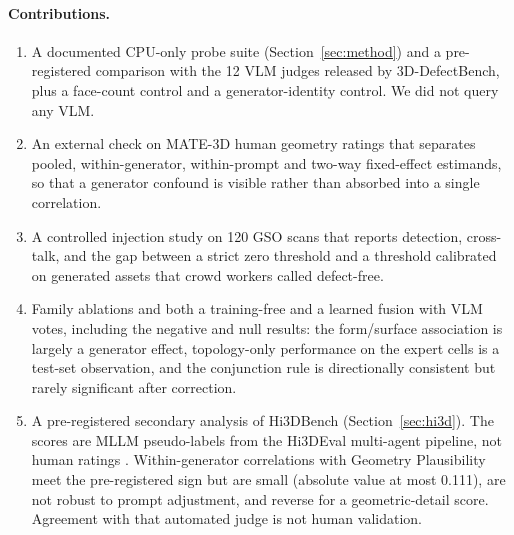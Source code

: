 \paragraph{Contributions.}
\begin{enumerate}
  \item A documented CPU-only probe suite (Section~\ref{sec:method}) and a pre-registered comparison with the 12 VLM judges released by 3D-DefectBench, plus a face-count control and a generator-identity control.
  We did not query any VLM.
  \item An external check on MATE-3D human geometry ratings that separates pooled, within-generator, within-prompt and two-way fixed-effect estimands, so that a generator confound is visible rather than absorbed into a single correlation.
  \item A controlled injection study on 120 GSO scans that reports detection, cross-talk, and the gap between a strict zero threshold and a threshold calibrated on generated assets that crowd workers called defect-free.
  \item Family ablations and both a training-free and a learned fusion with VLM votes, including the negative and null results: the form/surface association is largely a generator effect, topology-only performance on the expert cells is a test-set observation, and the conjunction rule is directionally consistent but rarely significant after correction.
  \item A pre-registered secondary analysis of Hi3DBench (Section~\ref{sec:hi3d}).
  The scores are MLLM pseudo-labels from the Hi3DEval multi-agent pipeline, not human ratings \citep{zhang2025hi3deval}.
  Within-generator correlations with Geometry Plausibility meet the pre-registered sign but are small (absolute value at most 0.111), are not robust to prompt adjustment, and reverse for a geometric-detail score.
  Agreement with that automated judge is not human validation.
\end{enumerate}
